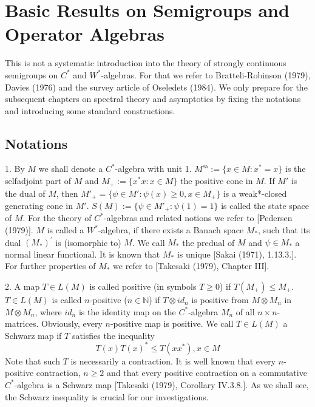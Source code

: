 \setcounter{chapter}{0}
\chapter{Basic Results on Semigroups and Operator Algebras}
This is not a systematic introduction into the theory of strongly continuous semigroups on $C^{*}$ and $W^{*}$-algebras.
For that we refer to Bratteli-Robinson (1979), Davies (1976) and the survey article of Oseledets (1984).
We only prepare for the subsequent chapters on spectral theory and asymptotics by fixing the notations and introducing some standard constructions.
\section{Notations}
1. By $M$ we shall denote a $C^{*}$-algebra with unit 1.
$M^{\text{sa}} := \{x \in M : x^{*} = x\}$ is the selfadjoint part of $M$ and $M_{+} := \{x^{*} x : x \in M\}$ the positive cone in $M$.
If $M'$ is the dual of $M$, then $M'_{+} = \{\psi \in M' : \psi(x) \geq 0, x \in M_{+}\}$ is a weak*-closed generating cone in $M'$.
$S(M) := \{\psi \in M'_{+} : \psi(1) = 1\}$ is called the state space of $M$.
For the theory of $C^{*}$-algebras and related notions we refer to [Pedersen (1979)].
$M$ is called a $W^{*}$-algebra, if there exists a Banach space $M_{*}$, such that its dual $(M_{*})^{'}$ is (isomorphic to) $M$.
We call $M_{*}$ the predual of $M$ and $\psi \in M_{*}$ a normal linear functional.
It is known that $M_{*}$ is unique [Sakai (1971), 1.13.3.].
For further properties of $M_{*}$ we refer to [Takesaki (1979), Chapter III].

2. A map $T \in L(M)$ is called positive (in symbols $T \geq 0$) if $T(M_{+}) \leq M_{+}$.
$T \in L(M)$ is called $n$-positive ($n \in \mathbb{N}$) if $T \otimes id_n$ is positive from $M \otimes M_n$ in $M \otimes M_n$, where $id_n$ is the identity map on the $C^{*}$-algebra $M_n$ of all $n \times n$-matrices.
Obviously, every $n$-positive map is positive.
We call $T \in L(M)$ a Schwarz map if $T$ satisfies the inequality
\[
T(x)T(x)^{*} \leq T(xx^{*}), x \in M
\]
Note that such $T$ is necessarily a contraction.
It is well known that every $n$-positive contraction, $n \geq 2$ and that every positive contraction on a commutative $C^{*}$-algebra is a Schwarz map [Takesaki (1979), Corollary IV.3.8.].
As we shall see, the Schwarz inequality is crucial for our investigations.

